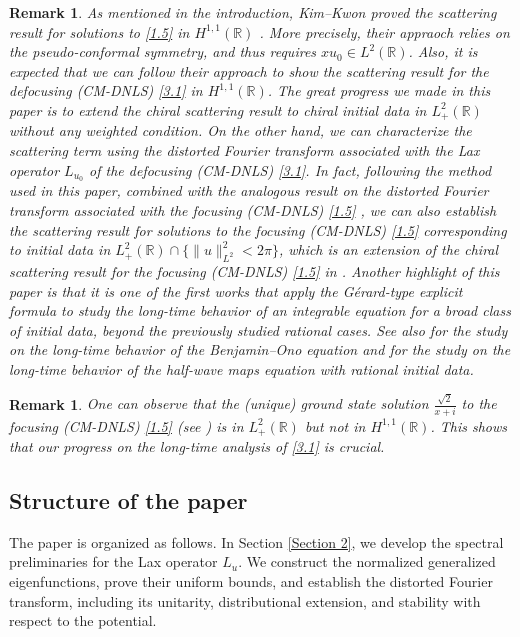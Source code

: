 \documentclass[10pt]{article}
\newtheorem{remark}[theorem]{Remark}
\numberwithin{equation}{section}
\numberwithin{theorem}{section}
\begin{document}
\begin{remark}
As mentioned in the introduction, Kim--Kwon proved the scattering result for solutions to \eqref{1.5} in $H^{1,1}(\mathbb{R})$ \cite{23}. More precisely, their appraoch relies on the pseudo-conformal symmetry, and thus requires $x u_0 \in L^2(\mathbb{R})$.  Also, it is expected that we can follow their approach to show the scattering result for the defocusing (CM-DNLS) \eqref{3.1} in $H^{1,1}(\mathbb{R})$.  The great progress we made in this paper is to extend the chiral scattering result to chiral initial data in $L_{+}^{2}(\mathbb R)$ without any weighted condition. On the other hand, we can characterize the scattering term using the distorted Fourier transform associated with the Lax operator $L_{u_0}$ of the defocusing (CM-DNLS) \eqref{3.1}. In fact, following the method used in this paper, combined with the analogous result on the distorted Fourier transform associated with the focusing  (CM-DNLS) \eqref{1.5} \cite[Section 4]{78}, we can also establish the scattering result for solutions to the focusing  (CM-DNLS) \eqref{1.5} corresponding to initial data in  $L_{+}^{2}(\mathbb R)\cap \{\|u\|_{L^2}^2 < 2\pi\}$, which is an extension of the chiral scattering result for the focusing (CM-DNLS) \eqref{1.5} in \cite{23}. Another highlight of this paper is that it is one of the first works that apply the Gérard-type explicit formula to study the long-time behavior of an integrable equation for a broad class of initial data, beyond the previously studied rational cases. See also \cite{29,0,0.01,0.1} for the study on the long-time behavior of the Benjamin--Ono equation and \cite{30} for the study on the long-time behavior of the half-wave maps equation with rational initial data.
\end{remark}
\begin{remark}
One can observe that the (unique) ground state solution $\frac{\sqrt{2}}{x+i}$ to the focusing (CM-DNLS) \eqref{1.5} (see \cite[Lemma 4.1]{5}) is in $L_{+}^{2}(\mathbb R)$ but not in $H^{1,1}(\mathbb{R})$. This shows that our progress on the long-time analysis of \eqref{3.1} is crucial.
\end{remark}
\subsection*{Structure of the paper}

The paper is organized as follows. In Section \ref{Section 2}, we develop the spectral preliminaries for
the Lax operator \(L_u\). We construct the normalized generalized eigenfunctions, prove
their uniform bounds, and establish the distorted Fourier transform, including its
unitarity, distributional extension, and stability with respect to the potential.
\end{document}
